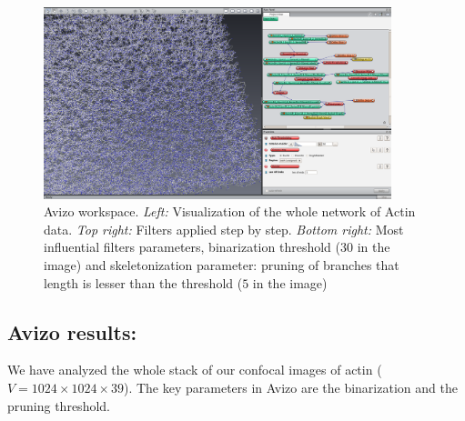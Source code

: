 \begin{figure}[h]

 
\includegraphics[width=0.9\textwidth]{Figures/chapter-image/avizo/workspace-wholedata.png}%

\caption[Avizo image: Actin network visualization and workspace]{Avizo
workspace. \emph{Left:} Visualization of the whole network of Actin data.
\emph{Top right:} Filters applied step by step. \emph{Bottom right:} Most
influential filters parameters, binarization threshold ($30$ in the image) and
skeletonization parameter: pruning of branches that length is lesser than the
threshold ($5$ in the image)}
\label{fig:avizo_workspace}
\end{figure}


\subsection{Avizo results:}
We have analyzed the whole stack of our confocal images of actin
($V=1024\times1024\times39$). The key parameters in Avizo are the binarization 
and the pruning threshold.

